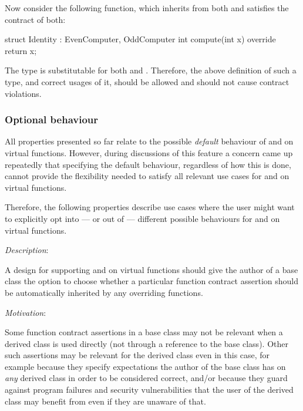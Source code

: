 Now consider the following function, which inherits from both and satisfies the contract of both:

\begin{codeblock}
struct Identity : EvenComputer, OddComputer {
  int compute(int x) override { 
    return x; 
  }
}
\end{codeblock}

The type  is substitutable for both  and . Therefore, the above definition of such a type, and correct usages of it, should be allowed and should not cause contract violations.


\subsubsection{Optional behaviour}

All properties presented so far relate to the possible \emph{default} behaviour of  and  on virtual functions. However, during discussions of this feature a concern came up repeatedly that specifying the default behaviour, regardless of how this is done, cannot provide the flexibility needed to  satisfy all relevant use cases for  and  on virtual functions.

Therefore, the following properties describe use cases where the user might want to explicitly opt into --- or out of --- different possible behaviours for  and  on virtual functions.

 
\emph{Description}: 
 
A design for supporting  and  on virtual functions should give the author of a base class the option to choose whether a particular function contract assertion should be automatically inherited by any overriding functions.

\emph{Motivation}:

Some function contract assertions in a base class may not be relevant when a derived class is used directly (not through a reference to the base class). Other such assertions may be relevant for the derived class even in this case, for example because they specify expectations the author of the base class has on \emph{any} derived class in order to be considered correct, and/or because they guard against program failures and security vulnerabilities that the user of the derived class may benefit from even if they are unaware of that. 

